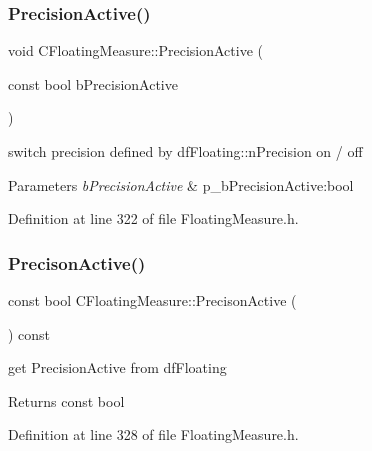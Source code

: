 \subsubsection{\texorpdfstring{Precision\+Active()}{PrecisionActive()}}
{\footnotesize\ttfamily void C\+Floating\+Measure\+::\+Precision\+Active (\begin{DoxyParamCaption}\item[{const bool}]{b\+Precision\+Active }\end{DoxyParamCaption})\hspace{0.3cm}{\ttfamily [inline]}}



switch precision defined by df\+Floating\+::n\+Precision on / off 


\begin{DoxyParams}{Parameters}
{\em b\+Precision\+Active} & p\+\_\+b\+Precision\+Active\+:bool \\
\hline
\end{DoxyParams}


Definition at line 322 of file Floating\+Measure.\+h.

\mbox{\label{classCFloatingMeasure_a90d47ac476295db3c208cb484cd75764}} 
\subsubsection{\texorpdfstring{Precison\+Active()}{PrecisonActive()}}
{\footnotesize\ttfamily const bool C\+Floating\+Measure\+::\+Precison\+Active (\begin{DoxyParamCaption}{ }\end{DoxyParamCaption}) const\hspace{0.3cm}{\ttfamily [inline]}}



get Precision\+Active from df\+Floating 

\begin{DoxyReturn}{Returns}
const bool 
\end{DoxyReturn}


Definition at line 328 of file Floating\+Measure.\+h.

\mbox{\label{classCFloatingMeasure_af4caaa697967a257bc6e13117843ff58}} 

